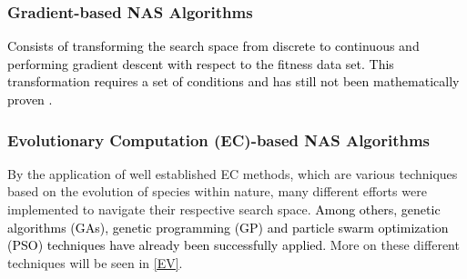 \documentclass[10pt,        %
               a4paper,     %
               journal,     %
               ]{IEEEtran}
\begin{document}
\subsubsection{\textbf{Gradient}-based NAS Algorithms}
\textcolor{black}{
Consists of transforming the search space from discrete to continuous and performing
gradient descent with respect to the fitness data set. This transformation requires a set of conditions
and has still not been mathematically proven \cite{liu2021survey}.
}

\subsubsection{\textbf{Evolutionary Computation} (EC)-based NAS Algorithms}
By the application of well established EC methods, which are various techniques based on the evolution of
species within nature, many different efforts were implemented to navigate their respective search space.
\textcolor{black}{
Among others, genetic algorithms (GAs), genetic programming (GP) and particle swarm optimization (PSO)
techniques have already been successfully applied.
}
More on these different techniques will be seen in \ref{EV}.
\end{document}

